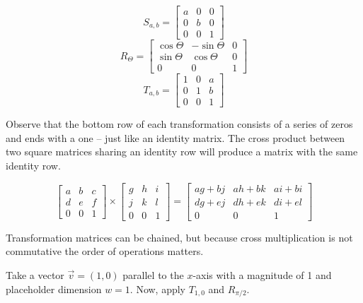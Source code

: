 \documentclass{book}
\begin{document}
\begin{equation}\label{eq:scale2}
S_{a,b}=\begin{bmatrix}a & 0 & 0\\ 0 & b & 0\\ 0 & 0 & 1\end{bmatrix}
\end{equation}
\begin{equation}\label{eq:rotate2}
R_\Theta = \begin{bmatrix}\cos{\Theta} & -\sin{\Theta} & 0\\ \sin{\Theta} & \cos{\Theta} & 0 \\ 0 & 0 & 1\end{bmatrix}
\end{equation}
\begin{equation}\label{eq:translate2}
T_{a,b}=\begin{bmatrix}1 & 0 & a\\0 & 1 & b\\0 & 0 & 1\end{bmatrix}
\end{equation}

Observe that the bottom row of each transformation consists of a series of zeros and ends with a one -- just like an identity matrix. The cross product between two square matrices sharing an identity row will produce a matrix with the same identity row.

\begin{equation*}
\begin{bmatrix}a & b & c \\ d & e & f \\ 0 & 0 & 1\end{bmatrix} \times
\begin{bmatrix}g & h & i \\ j & k & l \\ 0 & 0 & 1\end{bmatrix} = 
\begin{bmatrix}ag + bj & ah + bk & ai + bi \\
dg + ej & dh + ek & di + el \\
0 & 0 & 1
\end{bmatrix}
\end{equation*}

Transformation matrices can be chained, but because cross multiplication is not commutative the order of operations matters.

Take a vector $\vec{v}=(1,0)$ parallel to the $x$-axis with a magnitude of 1 and placeholder dimension $w=1$. Now, apply $T_{1,0}$ and $R_{\pi/2}$.
\end{document}
